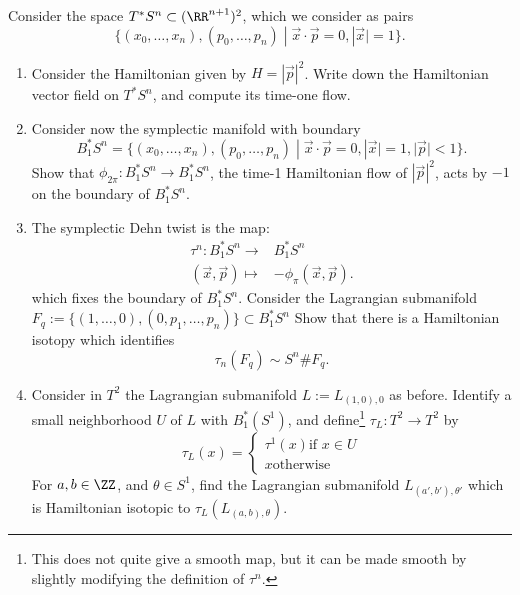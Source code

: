 
 
 
Consider the space $T^*S^n\subset (\RR^{n+1})^2$, which we consider as pairs \[\{(x_0, \ldots, x_n), (p_0, \ldots, p_n) \;|\;\vec x\cdot \vec p=0, |\vec x|=1 \}.\] 
\begin{enumerate}
    \item Consider the Hamiltonian given by $H=|\vec p|^2$. Write down the Hamiltonian vector field on $T^*S^n$, and compute its time-one flow.
    \item Consider now the symplectic manifold with boundary 
    \[B^*_1S^n=\{(x_0, \ldots, x_n), (p_0, \ldots, p_n) \;|\;\vec x\cdot \vec p =0,|\vec x|=1, |\vec p|<1\}.\]
    Show that $\phi_{2\pi}: B^*_1S^n\to B^*_1 S^n$, the time-1 Hamiltonian flow of $|\vec p|^2$, acts by  $-1$ on the boundary of $B^*_1S^n$. 
    \item The symplectic Dehn twist is the map: 
    \begin{align*}
        \tau^n: B^*_1 S^n\to& B^*_1 S^n\\
            (\vec x, \vec p) \mapsto& -\phi_{\pi}(\vec x, \vec p).
    \end{align*}
    which fixes the boundary of $B^*_1 S^n$.
    Consider the Lagrangian submanifold  $F_q:=\{(1, \ldots, 0), (0, p_1, \ldots, p_n)\}\subset B^*_1S^n$  Show that there is a Hamiltonian isotopy which identifies
    \[\tau_n(F_q)\sim S^n\# F_q.\]
    \item Consider in $T^2$ the Lagrangian submanifold $L:=L_{(1, 0),0}$ as before. Identify a small neighborhood $U$ of $L$ with $B^*_1(S^1)$, and define\footnote{This does not quite give a smooth map, but it can be made smooth by slightly modifying the definition of $\tau^n$.} $\tau_L: T^2\to T^2$ by 
    \[\tau_L(x)=\left\{\begin{array}{cc} \tau^1(x) \text{if $x\in U$}\\
        x \text{otherwise}\end{array}\right.\]
    For $a, b\in \ZZ$, and $\theta\in S^1$, find the Lagrangian submanifold $L_{(a', b'), \theta'}$ which is Hamiltonian isotopic to  $\tau_L(L_{(a, b), \theta})$.
\end{enumerate}

 
